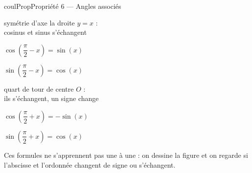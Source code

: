 \documentclass[11pt,a4paper]{article}
\makeatletter
\newcounter{lycee@signet}
\newcommand{\signet}[3][]{\stepcounter{lycee@signet}%
  \edef\lycee@dest{\if\relax\detokenize{#1}\relax
    signet.\arabic{lycee@signet}\else#1\fi}%
  \hypertarget{\lycee@dest}{}\bookmark[level=#2,dest=\lycee@dest]{#3}}
\newenvironment{proprietebox}[1][Propriété]%
  {\begin{boitecours}[phantom={\signet{2}{#1}}]{coulProp}{#1}}{\end{boitecours}}
\makeatother
\begin{document}
\begin{proprietebox}[Propriété 6 --- Angles associés]
\medskip
\bigskip
\hfill
\begin{minipage}[t]{0.32\linewidth}\centering
{}\par
{\small symétrie d'axe la droite $y=x$ :\\ cosinus et sinus s'échangent}\par\smallskip
$\cos\left(\dfrac{\pi}{2}-x\right)=\sin(x)$\par\smallskip
$\sin\left(\dfrac{\pi}{2}-x\right)=\cos(x)$
\end{minipage}\hspace{1.5cm}
\begin{minipage}[t]{0.32\linewidth}\centering
{}\par
{\small quart de tour de centre $O$ :\\ ils s'échangent, un signe change}\par\smallskip
$\cos\left(\dfrac{\pi}{2}+x\right)=-\sin(x)$\par\smallskip
$\sin\left(\dfrac{\pi}{2}+x\right)=\cos(x)$
\end{minipage}
\hfill\null

\medskip
Ces formules ne s'apprennent pas une à une : on dessine la figure et on regarde si
l'abscisse et l'ordonnée changent de signe ou s'échangent.

\end{proprietebox}
\end{document}
